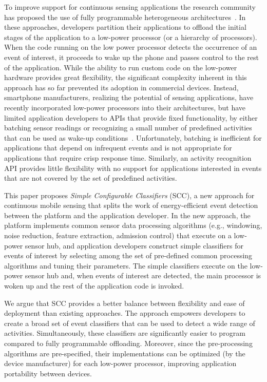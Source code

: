To improve support for continuous sensing applications the research
community has proposed the use of fully progra\-mmable heterogeneous
architectures~\cite{reflex,littlerock,turducken}.  In these
approaches, developers partition their applications to offload the
initial stages of the application to a low-power processor (or a
hierarchy of processors).  When the code running on the low power
processor detects the occurrence of an event of interest, it proceeds
to wake up the phone and passes control to the rest of the
application.  While the ability to run custom code on the low-power
hardware provides great flexibility, the significant complexity
inherent in this approach has so far prevented its adoption in
commercial devices.  Instead, smartphone manufacturers, realizing the
potential of sensing applications, have recently incorporated
low-power processors into their architectures, but have limited
application developers to APIs that provide fixed functionality, by
either batching sensor readings or recognizing a small number of
predefined activities that can be used as wake-up
conditions~\cite{androidMotionSensors,coreMotion,motox}.
Unfortunately, batching is inefficient for applications that depend on
infrequent events and is not appropriate for applications that require
crisp response time.  Similarly, an activity recognition API provides
little flexibility with no support for applications interested in
events that are not covered by the set of predefined activities.

This paper proposes {\em Simple Configurable Classifiers} (SCC), a new
approach for continuous mobile sensing that splits the work of
energy-efficient event detection between the platform and the
application developer.  In the new approach, the platform implements
common sensor data processing algorithms (e.g., windowing, noise 
reduction, feature extraction, admission control) that execute on a 
low-power sensor hub, and application developers construct simple 
classifiers for events of interest by selecting among the set of
pre-defined common processing algorithms and tuning their
parameters.  The simple classifiers execute on the
low-power sensor hub and, when events of interest are detected, the
main processor is woken up and the rest of the application code is
invoked.
  
We argue that SCC provides a better
balance between flexibility and ease of deployment than existing
approaches.  The approach empowers developers to create a broad set of
event classifiers that can be used to detect a wide range of
activities.  Simultaneously, these classifiers are significantly
easier to program compared to fully programmable offloading.
Moreover, since the pre-processing algorithms are pre-specified, their
implementations can be optimized (by the device manufacturer) for each
low-power processor, improving application portability between
devices.  

